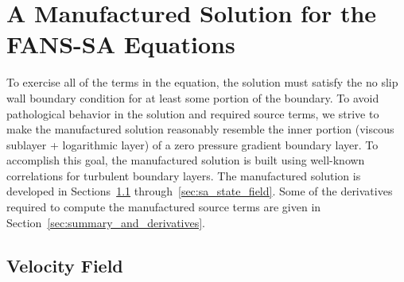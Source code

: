 
\section{A Manufactured Solution for the FANS-SA Equations}\label{oliver}
To exercise all of the terms in the equation, the
solution must satisfy the no slip wall boundary condition for at least
some portion of the boundary.  To avoid pathological behavior in the
solution and required source terms, we strive to make the manufactured
solution reasonably resemble the inner portion (viscous sublayer +
logarithmic layer) of a zero pressure gradient boundary layer.  To
accomplish this goal, the manufactured solution is built using
well-known correlations for turbulent boundary layers.  The
manufactured solution is developed in
Sections~\ref{sec:velocity_field} through~\ref{sec:sa_state_field}.
Some of the derivatives required to compute the manufactured source
terms are given in Section~\ref{sec:summary_and_derivatives}. 



\subsection{Velocity Field} \label{sec:velocity_field}


